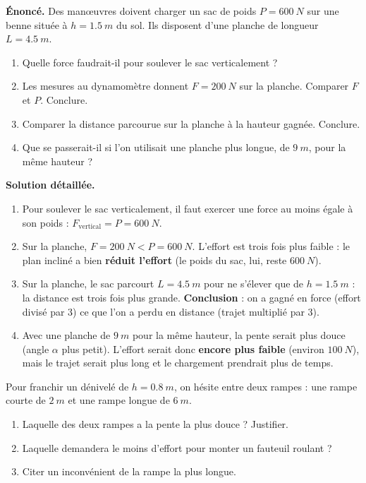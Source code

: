 \documentclass[11pt]{article}
\begin{document}
\begin{exoresolu}
\textbf{Énoncé.} Des manœuvres doivent charger un sac de poids $P = \SI{600}{N}$ sur une benne située à $h = \SI{1,5}{m}$ du sol. Ils disposent d'une planche de longueur $L = \SI{4,5}{m}$.
\begin{enumerate}
  \item Quelle force faudrait-il pour soulever le sac verticalement ?
  \item Les mesures au dynamomètre donnent $F = \SI{200}{N}$ sur la planche. Comparer $F$ et $P$. Conclure.
  \item Comparer la distance parcourue sur la planche à la hauteur gagnée. Conclure.
  \item Que se passerait-il si l'on utilisait une planche plus longue, de $\SI{9}{m}$, pour la même hauteur ?
\end{enumerate}
\tcblower
\textbf{Solution détaillée.}
\begin{enumerate}
  \item Pour soulever le sac verticalement, il faut exercer une force au moins égale à son poids : $F_{\text{vertical}} = P = \SI{600}{N}$.
  \item Sur la planche, $F = \SI{200}{N} < P = \SI{600}{N}$. L'effort est trois fois plus faible : le plan incliné a bien \textbf{réduit l'effort} (le poids du sac, lui, reste $\SI{600}{N}$).
  \item Sur la planche, le sac parcourt $L = \SI{4,5}{m}$ pour ne s'élever que de $h = \SI{1,5}{m}$ : la distance est trois fois plus grande. \textbf{Conclusion} : on a gagné en force (effort divisé par 3) ce que l'on a perdu en distance (trajet multiplié par 3).
  \item Avec une planche de $\SI{9}{m}$ pour la même hauteur, la pente serait plus douce (angle $\alpha$ plus petit). L'effort serait donc \textbf{encore plus faible} (environ $\SI{100}{N}$), mais le trajet serait plus long et le chargement prendrait plus de temps.
\end{enumerate}
\end{exoresolu}

\begin{exercice}
Pour franchir un dénivelé de $h = \SI{0,8}{m}$, on hésite entre deux rampes : une rampe courte de $\SI{2}{m}$ et une rampe longue de $\SI{6}{m}$.
\begin{enumerate}
  \item Laquelle des deux rampes a la pente la plus douce ? Justifier.
  \item Laquelle demandera le moins d'effort pour monter un fauteuil roulant ?
  \item Citer un inconvénient de la rampe la plus longue.
\end{enumerate}
\end{exercice}
\end{document}
